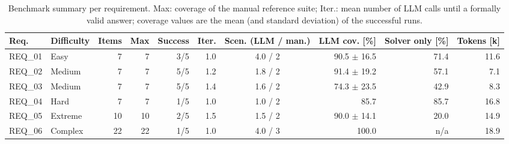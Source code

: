 \begin{table}[htbp]
  \centering
  \small
  \caption{Benchmark summary per requirement. Max: coverage of the manual reference suite; Iter.: mean number of LLM calls until a formally valid answer; coverage values are the mean (and standard deviation) of the successful runs.}
  \label{tab:benchmark-summary}
  \begin{tabular}{llrrrrcrrr}
    \toprule
    Req. & Difficulty & Items & Max & Success & Iter. & Scen. (LLM / man.) & LLM cov. [\%] & Solver only [\%] & Tokens [k] \\
    \midrule
    REQ\_01 & Easy & 7 & 7 & 3/5 & 1.0 & 4.0 / 2 & 90.5 $\pm$ 16.5 & 71.4 & 11.6 \\
    REQ\_02 & Medium & 7 & 7 & 5/5 & 1.2 & 1.8 / 2 & 91.4 $\pm$ 19.2 & 57.1 & 7.1 \\
    REQ\_03 & Medium & 7 & 7 & 5/5 & 1.4 & 1.6 / 2 & 74.3 $\pm$ 23.5 & 42.9 & 8.3 \\
    REQ\_04 & Hard & 7 & 7 & 1/5 & 1.0 & 1.0 / 2 & 85.7 & 85.7 & 16.8 \\
    REQ\_05 & Extreme & 10 & 10 & 2/5 & 1.5 & 1.5 / 2 & 90.0 $\pm$ 14.1 & 20.0 & 14.9 \\
    REQ\_06 & Complex & 22 & 22 & 1/5 & 1.0 & 4.0 / 3 & 100.0 & n/a & 18.9 \\
    \bottomrule
  \end{tabular}
\end{table}
